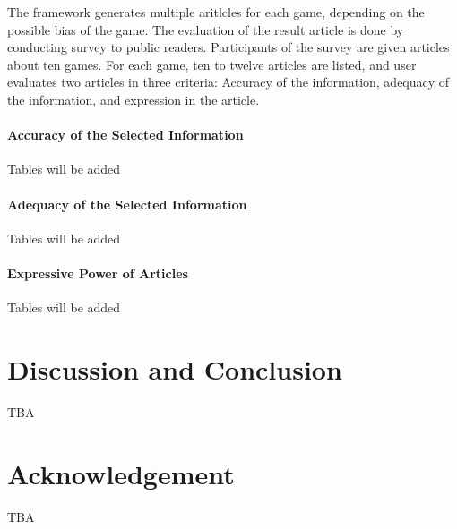 \documentclass{sig-alternate}
\begin{document}
The framework generates multiple aritlcles for each game, depending on the possible bias of the game. 
The evaluation of the result article is done by conducting survey to public readers. Participants of the survey are given articles about ten games. For each game, ten to twelve articles are listed, and user evaluates two articles in three criteria: Accuracy of the information, adequacy of the information, and expression in the article. 

\paragraph{Accuracy of the Selected Information}

Tables will be added

\paragraph{Adequacy of the Selected Information} 

Tables will be added

\paragraph{Expressive Power of Articles} 

Tables will be added


\section{Discussion and Conclusion}

TBA

\section{Acknowledgement} 

TBA


 
\end{document}

